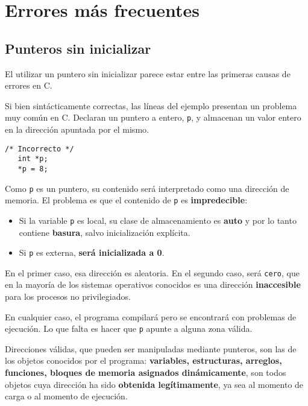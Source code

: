 
\section{Errores más frecuentes}
\label{sec:tc-punteros}

\subsection{Punteros sin inicializar}
El utilizar un puntero sin inicializar parece estar entre las primeras causas
de errores en C.

\begin{ejemplo}
Si bien sintácticamente correctas, las líneas del ejemplo presentan un problema
muy común en C. Declaran un puntero a entero, \lstinline{p}, y almacenan un valor entero en
la dirección apuntada por el mismo. 

\begin{lstlisting}
/* Incorrecto */
   int *p;
   *p = 8;
\end{lstlisting}   

Como \lstinline{p} es un puntero, su contenido será interpretado como una dirección de memoria. El problema es que el contenido de \lstinline{p} es \textbf{impredecible}:
\begin{itemize}
	\item Si la variable \lstinline{p} es local, su clase de almacenamiento es \textbf{auto} y
por lo tanto contiene \textbf{basura}, salvo inicialización explícita. 
	\item Si \lstinline{p} es externa, \textbf{será inicializada a 0}. 
\end{itemize}

En el primer caso, esa dirección es aleatoria. En el segundo caso, será \lstinline{cero}, que en la mayoría de los sistemas operativos conocidos es una dirección \textbf{inaccesible} para los procesos no privilegiados.  

En cualquier caso, el programa compilará pero se encontrará con problemas de ejecución. Lo que falta es hacer que \lstinline{p} apunte a alguna zona válida.

Direcciones válidas, que pueden ser manipuladas mediante punteros, son las de
los objetos conocidos por el programa: \textbf{variables, estructuras, arreglos,
funciones, bloques de memoria asignados dinámicamente}, son todos objetos cuya
dirección ha sido \textbf{obtenida legítimamente}, ya sea al momento de carga o al
momento de ejecución. 
\end{ejemplo}

